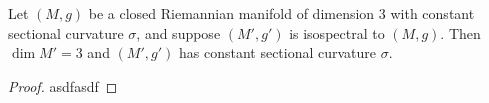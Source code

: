 \begin{proposition}\cite[prop. E.IV.18 of]{Berger.Gauduchon.Mazet-[SpectreVarieteRiemannienne]1971a}
  Let $(M,g)$ be a closed Riemannian manifold of dimension $3$ with constant sectional curvature $\sigma$, and suppose $(M',g')$ is isospectral to $(M,g)$. Then $\dim M' =3$ and $(M',g')$ has constant sectional curvature $\sigma$.
\end{proposition}
\begin{proof}
  asdfasdf
\end{proof}


